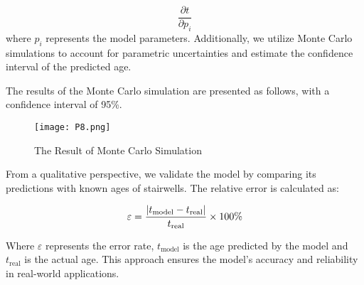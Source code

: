 \documentclass{mcmthesis}
\begin{document}
\begin{equation}
\label{eq12}
\frac{\partial t}{\partial p_i}
\end{equation}
where \( p_i \) represents the model parameters. Additionally, we utilize Monte Carlo simulations to account for parametric uncertainties and estimate the confidence interval of the predicted age.

The results of the Monte Carlo simulation are presented as follows, with a confidence interval of 95\%.

\begin{figure}[htp]
    \centering
    \texttt{[image: P8.png]}
    \caption{The Result of Monte Carlo Simulation}
\end{figure}

\newpage
From a qualitative perspective, we validate the model by comparing its predictions with known ages of stairwells. The relative error is calculated as:

\begin{equation}
\label{eq16}
\hfill \varepsilon = \frac{|t_{\text{model}} - t_{\text{real}}|}{t_{\text{real}}} \times 100\% 
\end{equation}

Where \(\varepsilon\) represents the error rate, \( t_{\text{model}} \) is the age predicted by the model and \( t_{\text{real}} \) is the actual age. This approach ensures the model's accuracy and reliability in real-world applications.





\end{document}
